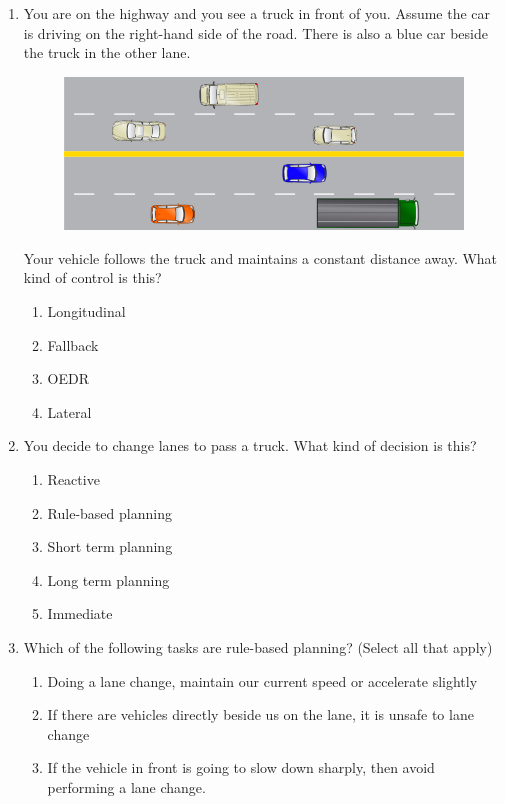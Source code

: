 \begin{enumerate}
\item You are on the highway and you see a truck in front of you. Assume the car is driving on the right-hand side of the road. 
There is also a blue car beside the truck in the other lane.


\begin{figure}[!htb]
\begin{center}
\includegraphics[scale=0.280]{img/intro_self_driving/summary_question_scenario_3.png}
\end{center}
\label{summary_question_scenario_3}
\end{figure}

Your vehicle follows the truck and maintains a constant distance away. What kind of control is this?

\begin{enumerate}
\item Longitudinal
\item Fallback
\item OEDR
\item Lateral
\end{enumerate}

\item You decide to change lanes to pass a truck. What kind of decision is this?

\begin{enumerate}
\item Reactive
\item Rule-based planning
\item Short term planning
\item Long term planning
\item Immediate
\end{enumerate}

\item Which of the following tasks are rule-based planning? (Select all that apply) 

\begin{enumerate}
\item Doing a lane change, maintain our current speed or accelerate slightly
\item If there are vehicles directly beside us on the lane, it is unsafe to lane change
\item If the vehicle in front is going to slow down sharply, then avoid performing a lane change.
\end{enumerate}


\end{enumerate}
